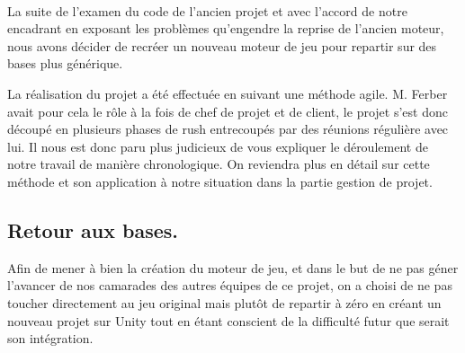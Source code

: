 \documentclass{report}
\begin{document}
\paragraph{} La suite de l'examen du code de l'ancien projet et avec l'accord de notre encadrant en exposant les problèmes qu'engendre la reprise de l'ancien moteur, nous avons décider de recréer un nouveau moteur de jeu pour repartir sur des bases plus générique.


La réalisation du projet a été effectuée en suivant une méthode agile. M. Ferber avait pour cela le rôle à la fois de chef de projet et de client, le projet s'est donc découpé en plusieurs phases de rush entrecoupés par des réunions régulière avec lui. Il nous est donc paru plus judicieux de vous expliquer le déroulement de notre travail de manière chronologique. On reviendra plus en détail sur cette méthode et son application à notre situation dans la partie gestion de projet. 


\subsection{Retour aux bases.}

Afin de mener à bien la création du moteur de jeu, et dans le but de ne pas géner l'avancer de nos camarades des autres équipes de ce projet, on a choisi de ne pas toucher directement au jeu original mais plutôt de repartir à zéro en créant un nouveau projet sur Unity tout en étant conscient de la difficulté futur que serait son intégration.
\end{document}
